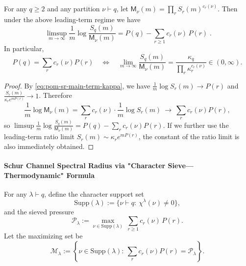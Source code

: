 \begin{theorem}\label{thm:pom-partition-resonance-ratio-test}
For any \(q\ge 2\) and any partition \(\nu\vdash q\), let \(\mathsf{M}_\nu(m)=\prod_r S_r(m)^{c_r(\nu)}\).
Then under the above leading-term regime we have
\[
\boxed{\;
\limsup_{m\to\infty}\frac{1}{m}\log\frac{S_q(m)}{\mathsf{M}_\nu(m)}
=P(q)-\sum_{r\ge 1}c_r(\nu)\,P(r)\; }.
\]
In particular,
\[
P(q)=\sum_{r}c_r(\nu)P(r)
\quad\Longleftrightarrow\quad
\lim_{m\to\infty}\frac{S_q(m)}{\mathsf{M}_\nu(m)}
=\frac{\kappa_q}{\prod_{r}\kappa_r^{c_r(\nu)}}\in(0,\infty).
\]
\end{theorem}
\begin{proof}
By \eqref{eq:pom-sr-main-term-kappa}, we have
\(
\frac{1}{m}\log S_r(m)\to P(r)
\)
and
\(
\frac{S_r(m)}{\kappa_r e^{mP(r)}}\to 1
\).
Therefore
\[
\frac{1}{m}\log \mathsf{M}_\nu(m)
=\sum_r c_r(\nu)\cdot \frac{1}{m}\log S_r(m)\ \longrightarrow\ \sum_r c_r(\nu)P(r),
\]
so
\(
\limsup\frac1m\log\frac{S_q(m)}{\mathsf{M}_\nu(m)}
=P(q)-\sum_r c_r(\nu)P(r)
\).
If we further use the leading-term ratio limit \(S_r(m)\sim \kappa_r e^{mP(r)}\), the constant of the ratio limit is also immediately obtained.
\end{proof}

\paragraph{Schur Channel Spectral Radius via "Character Sieve—Thermodynamic" Formula}
For any \(\lambda\vdash q\), define the character support set
\[
\mathrm{Supp}(\lambda):=\{\nu\vdash q:\ \chi^\lambda(\nu)\neq 0\},
\]
and the sieved pressure
\[
\mathcal{P}_\lambda:=\max_{\nu\in\mathrm{Supp}(\lambda)}\ \sum_{r\ge 1}c_r(\nu)\,P(r).
\]
Let the maximizing set be
\[
\mathcal{M}_\lambda:=\left\{\nu\in\mathrm{Supp}(\lambda):\ \sum_{r}c_r(\nu)P(r)=\mathcal{P}_\lambda\right\}.
\]

